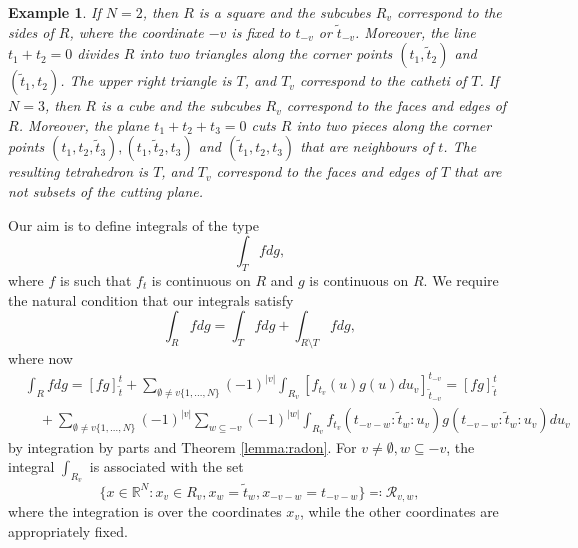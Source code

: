 \documentclass[english, a4paper, 12pt,reqno]{amsart}
\newtheorem{ex}[defi]{Example}
\begin{document}
\begin{ex}
\label{ex:T}
If $N=2$, then $R$ is a square and the subcubes $R_v$ correspond to the sides of $R$, where the coordinate $-v$ is fixed to $t_{-v}$ or $\tilde{t}_{-v}$. Moreover, the line $t_1+t_2 =0$ divides $R$ into two triangles along the corner points $(t_1, \tilde{t}_2)$ and $(\tilde{t}_1, t_2)$. The upper right triangle is $T$, and $T_v$ correspond to the catheti of $T$.  If $N=3$, then $R$ is a cube and the subcubes $R_v$ correspond to the faces and edges of $R$. Moreover, the plane $t_1+t_2+t_3 = 0$ cuts $R$ into two pieces along the corner points $(t_1,t_2,\tilde{t}_3), (t_1, \tilde{t}_2,t_3)$ and $(\tilde{t}_1, t_2,t_3)$ that are neighbours of $t$. The resulting tetrahedron is $T$, and $T_v$ correspond to the faces and edges of $T$ that are not subsets of the cutting plane.
\end{ex}
Our aim is to define integrals of the type
\begin{equation}
\label{integral}
 \int_T f dg,
\end{equation}
where $f$ is such that $f_t$ is continuous on $R$ and $g$ is continuous on $R$. We require the natural condition that our integrals satisfy 
$$\int_R f dg = \int_T f dg + \int_{R\setminus T} f dg,$$
where now
\begin{equation}
\label{wholeintegral}
\begin{split}
&\int_R f dg = [fg]_{\tilde{t}}^t + \sum_{\emptyset \neq v\{1,\dots,N\}} (-1)^{|v|} \int_{R_v} [f_{t_v}(u)g(u) du_v]_{\tilde{t}_{-v}}^{t_{-v}}
= [fg]_{\tilde{t}}^t\\
&\quad + \sum_{\emptyset \neq v \{1,\dots,N\}} (-1)^{|v|} \sum_{w\subseteq -v} (-1)^{|w|}\int_{R_v} f_{t_v}(t_{-v-w}:\tilde{t}_w:u_v)g(t_{-v-w}:\tilde{t}_w:u_v) du_v
\end{split}
\end{equation}
by integration by parts and Theorem \ref{lemma:radon}. For $v\neq \emptyset, w\subseteq -v$, the integral $\int_{R_v}$ is associated with the set
\begin{equation}
\label{set2}
\{x\in\mathbb{R}^N: x_v \in R_v, x_w = \tilde{t}_w, x_{-v-w} = t_{-v-w}\} \eqqcolon \mathcal{R}_{v,w},
\end{equation}
where the integration is over the coordinates $x_v$, while the other coordinates are appropriately fixed. 
\end{document}
